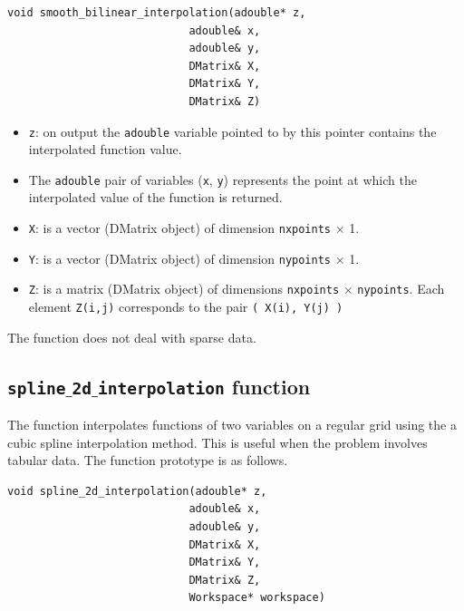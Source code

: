 \documentclass[a4paper,11pt]{report}    %
\begin{document}
\begin{verbatim} 
void smooth_bilinear_interpolation(adouble* z, 
                            adouble& x, 
                            adouble& y, 
                            DMatrix& X, 
                            DMatrix& Y, 
                            DMatrix& Z)
\end{verbatim}


\begin{itemize}
\item \verb|z|:  on output the \verb|adouble| variable pointed to by this pointer contains the interpolated function value.
\item  The \verb|adouble| pair of variables (\verb|x|, \verb|y|) represents the point at which the interpolated value of the function is returned.
\item  \verb|X|: is a vector (DMatrix object) of dimension \verb|nxpoints| $\times$ 1.
\item  \verb|Y|: is a vector (DMatrix object) of dimension \verb|nypoints| $\times$ 1.
\item  \verb|Z|: is a matrix (DMatrix object) of dimensions \verb|nxpoints| $\times$ \verb|nypoints|.  Each element \verb|Z(i,j)| corresponds to the pair \verb|( X(i), Y(j) )|
\end{itemize}


The function does not deal with sparse data. 


\subsection{ \texttt{spline$\_$2d$\_$interpolation} function }

The function interpolates functions of two variables on a regular grid using the a cubic spline interpolation method. 
This is useful when the problem involves tabular data. The function prototype is as follows.

\begin{verbatim} 
void spline_2d_interpolation(adouble* z, 
                            adouble& x, 
                            adouble& y, 
                            DMatrix& X, 
                            DMatrix& Y, 
                            DMatrix& Z,
                            Workspace* workspace)
\end{verbatim}
\end{document}
